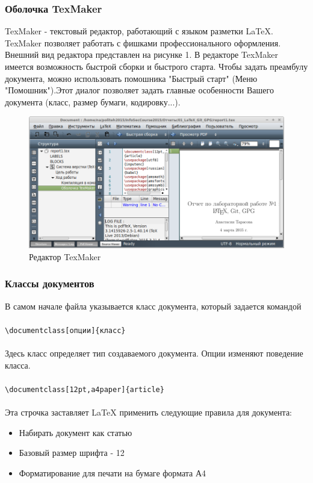 \documentclass[12pt,a4paper]{article}
\begin{document}
\subsubsection{Оболочка TexMaker}
TexMaker - текстовый редактор, работающий с языком разметки LaTeX. TexMaker позволяет работать с фишками профессионального оформления. Внешний вид редактора представлен на рисунке 1. В редакторе TexMaker имеется возможность быстрой сборки и быстрого старта. Чтобы задать преамбулу документа, можно использовать помошника "Быстрый старт" (Меню "Помошник").Этот диалог позволяет задать главные особенности Вашего документа (класс, размер бумаги, кодировку...).
\begin{figure}[h!]
\centering
\includegraphics[scale=0.5]{res/texmaker}
\caption{Редактор TexMaker}
\end{figure}
\subsubsection{Классы документов}
В самом начале файла указывается класс документа, который задается командой\\\\
\verb+\documentclass[опции]{класс}+
\\\\Здесь класс определяет тип создаваемого документа. Опции изменяют поведение класса.\\\\
\verb+\documentclass[12pt,a4paper]{article}+ 
\\\\Эта строчка заставляет \LaTeX{} применить следующие правила для документа:

\begin{itemize}
\item[] Набирать документ как статью
\item[] Базовый размер шрифта - 12
\item[] Форматирование для печати на бумаге формата А4
\end{itemize}
\end{document}
